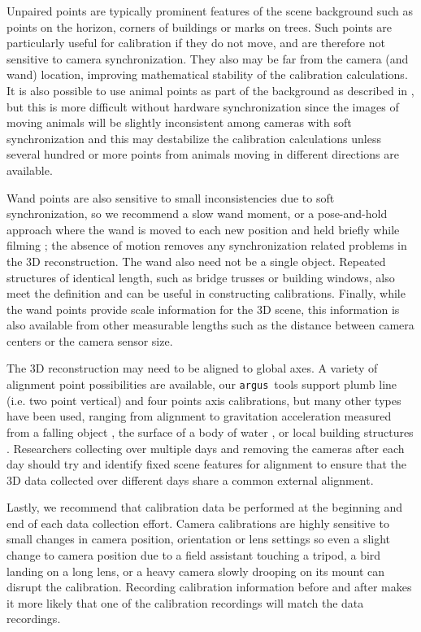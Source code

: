 \documentclass[fleqn,10pt]{wlpeerj}
\newcommand{\argus}{\texttt{argus}}
\begin{document}
Unpaired points are typically prominent features of the scene background such as points on the horizon, corners of buildings or marks on trees. Such points are particularly useful for calibration if they do not move, and are therefore not sensitive to camera synchronization.  They also may be far from the camera (and wand) location, improving mathematical stability of the calibration calculations. It is also possible to use animal points as part of the background as described in \citep{Theriault:2014}, but this is more difficult without hardware synchronization since the images of moving animals will be slightly inconsistent among cameras with soft synchronization and this may destabilize the calibration calculations unless several hundred or more points from animals moving in different directions are available.

Wand points are also sensitive to small inconsistencies due to soft synchronization, so we recommend a slow wand moment, or a pose-and-hold approach where the wand is moved to each new position and held briefly while filming ; the absence of motion removes any synchronization related problems in the 3D reconstruction. The wand also need not be a single object.  Repeated structures of identical length, such as bridge trusses or building windows, also meet the definition and can be useful in constructing calibrations. Finally, while the wand points provide scale information for the 3D scene, this information is also available from other measurable lengths such as the distance between camera centers or the camera sensor size. 

The 3D reconstruction may need to be aligned to global axes.  A variety of alignment point possibilities are available, our \argus\ tools support plumb line (i.e. two point vertical) and four points axis calibrations, but many other types have been used, ranging from alignment to gravitation acceleration measured from a falling object \citep{Shelton14}, the surface of a body of water \citep{clifton2015}, or local building structures \citep{sholtis2015}. Researchers collecting over multiple days and removing the cameras after each day should try and identify fixed scene features for alignment to ensure that the 3D data collected over different days share a common external alignment.

Lastly, we recommend that calibration data be performed at the beginning and end of each data collection effort. Camera calibrations are highly sensitive to small changes in camera position, orientation or lens settings so even a slight change to camera position due to a field assistant touching a tripod, a bird landing on a long lens, or a heavy camera slowly drooping on its mount can disrupt the calibration. Recording calibration information before and after makes it more likely that one of the calibration recordings will match the data recordings.
\end{document}
